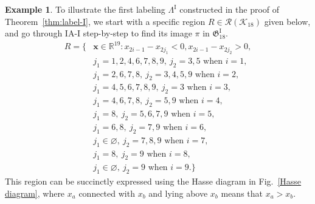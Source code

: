 \documentclass[11pt,reqno]{amsart}
\numberwithin{equation}{section}
\theoremstyle{plain}
\theoremstyle{definition}
\newtheorem{example}[theorem]{Example}
\newcommand{\bR}{\mathbb{R}}
\newcommand{\bx}{\mathbf{x}}
\newcommand{\fG}{\mathfrak{G}}
\newcommand{\cK}{\mathcal{K}}
\newcommand{\cR}{\mathcal{R}}
\newcommand{\GI}{\fG^{\mathrm{I}}}
\newcommand{\LI}{\Lambda^{\mathrm{I}}}
\begin{document}
 \begin{example}\label{ex-I}
 	To illustrate the first labeling $\LI$ constructed in the proof of Theorem~\ref{thm:label-I}, we start with a specific region $R\in\cR(\cK_{18})$ given below, and go through IA-I step-by-step to find its image $\pi$ in $\GI_{18}$.
 	\begin{align*}
 	R=\{ & \bx\in\bR^{19}: x_{2i-1}-x_{2j_1}<0, x_{2i-1}-x_{2j_2}>0,\\
 	& j_1=1,2,4,6,7,8,9,~j_2=3,5 \text{ when } i=1,\\
 	& j_1=2,6,7,8,~j_2=3,4,5,9 \text{ when } i=2,\\
 	& j_1=4,5,6,7,8,9,~j_2=3 \text{ when } i=3,\\
 	& j_1=4,6,7,8,~j_2=5,9 \text{ when } i=4,\\
 	& j_1=8,~j_2=5,6,7,9 \text{ when } i=5,\\
 	& j_1=6,8,~j_2=7,9\text{ when } i=6,\\
 	& j_1\in \varnothing,~j_2=7,8,9\text{ when }i=7,\\
 	& j_1=8,~j_2=9 \text{ when } i=8,\\
 	& j_1\in \varnothing,~j_2=9 \text{ when } i=9.\}
 	\end{align*}
 	This region can be succinctly expressed using the Hasse diagram in Fig.~\ref{Hasse diagram}, where $x_a$ connected with $x_b$ and lying above $x_b$ means that $x_a>x_b$.


\end{example}
\end{document}
